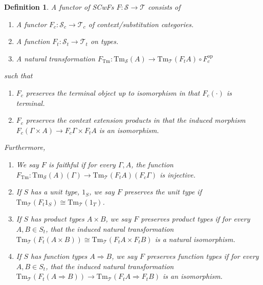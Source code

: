 \documentclass[12pt]{article}
\newtheorem{definition}{Definition}
\newcommand{\cat}{\mathcal}
\newcommand{\Tm}{\mathrm{Tm}}
\begin{document}
\begin{definition}
  A functor of SCwFs $F : \cat S \to \cat T$ consists of
  \begin{enumerate}
  \item A functor $F_c : \cat S_c \to \cat T_c$ of context/substitution categories.
  \item A function $F_t : \cat S_t \to \cat T_t$ on types.
  \item A natural transformation $F_{\Tm} : \Tm_{\cat S}(A) \to \Tm_{\cat T}(F_tA) \circ F_c^{\textrm{op}}$
  \end{enumerate}
  such that
  \begin{enumerate}
  \item $F_c$ preserves the terminal object up to isomorphism in that $F_c(\cdot)$ is terminal.
  \item $F_c$ preserves the context extension products in that the induced
    morphism $F_c(\Gamma \times A) \to F_c\Gamma \times F_t A$ is an isomorphism.
  \end{enumerate}

  Furthermore,
  \begin{enumerate}
  \item We say $F$ is \emph{faithful} if for every $\Gamma, A$, the
    function $F_{\Tm} : \Tm_{\cat S}(A)(\Gamma) \to \Tm_{\cat T}(F_tA)(F_c\Gamma)$
    is injective.
  \item If $S$ has a unit type, $1_S$, we say $F$ preserves the unit type
    if $\Tm_{\cat T}(F_t1_S) \cong \Tm_{\cat T}(1_T)$.
  \item If $S$ has product types $A \times B$, we say $F$ preserves
    product types if for every $A,B \in S_t$, that the induced natural
    transformation $\Tm_{\cat T}(F_t(A \times B)) \cong \Tm_{\cat T}(F_tA \times
    F_tB)$ is a natural isomorphism.
  \item If $S$ has function types $A \Rightarrow B$, we say $F$
    preserves function types if for every $A,B \in S_t$, that the
    induced natural transformation $\Tm_{\cat T}(F_t(A \Rightarrow B)) \to
    \Tm_{\cat T}(F_tA \Rightarrow F_tB)$ is an isomorphism.
  \end{enumerate}
\end{definition}
\end{document}
